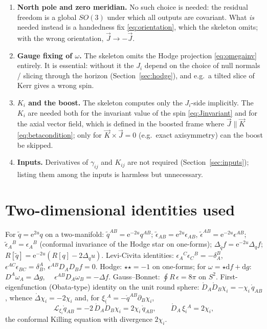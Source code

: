 \documentclass[11pt]{article}
\newcommand{\dd}{\mathrm{d}}
\newcommand{\ee}{\mathrm{e}}
\newcommand{\Lie}{\mathcal{L}}
\newcommand{\qo}{\mathring{q}}          %
\newcommand{\Do}{\mathring{D}}          %
\newcommand{\Lapo}{\mathring{\Delta}}   %
\newcommand{\vJ}{\vec{J}}
\newcommand{\vK}{\vec{K}}
\begin{document}
\begin{enumerate}
  have period $2\pi$).  The physical area form still appears in the final
  integrals \eqref{eq:JKeval}.
\item \textbf{North pole and zero meridian.}  No such choice is needed: the
  residual freedom is a global $SO(3)$ under which all outputs are
  covariant.  What \emph{is} needed instead is a handedness fix
  \eqref{eq:orientation}, which the skeleton omits; with the wrong
  orientation, $\vJ \to -\vJ$.
\item \textbf{Gauge fixing of $\omega$.}  The skeleton omits the Hodge
  projection \eqref{eq:omegainv} entirely.  It is essential: without it the
  $J_i$ depend on the choice of null normals / slicing through the horizon
  (Section~\ref{sec:hodge}), and e.g.\ a tilted slice of Kerr gives a wrong
  spin.
\item \textbf{$K_i$ and the boost.}  The skeleton computes only the
  $J_i$-side implicitly.  The $K_i$ are needed both for the invariant value
  of the spin \eqref{eq:Jinvariant} and for the axial vector field, which is
  defined in the boosted frame where $\vJ\parallel\vK$
  \eqref{eq:betacondition}; only for $\vK\times\vJ = 0$ (e.g.\ exact
  axisymmetry) can the boost be skipped.
\item \textbf{Inputs.}  Derivatives of $\gamma_{ij}$ and $K_{ij}$ are not
  required (Section~\ref{sec:inputs}); listing them among the inputs is
  harmless but unnecessary.
\end{enumerate}

\section{Two-dimensional identities used}
\label{app:identities}

For $\tilde q = \ee^{2u}q$ on a two-manifold:
$\tilde q^{AB} = \ee^{-2u}q^{AB}$;
$\tilde\epsilon_{AB} = \ee^{2u}\epsilon_{AB}$,
$\tilde\epsilon^{AB} = \ee^{-2u}\epsilon^{AB}$;
$\tilde\epsilon_A{}^B = \epsilon_A{}^B$ (conformal invariance of the Hodge
star on one-forms);
$\Delta_{\tilde q}f = \ee^{-2u}\Delta_q f$;
$R[\tilde q] = \ee^{-2u}(R[q] - 2\Delta_q u)$.
Levi-Civita identities: $\epsilon_A{}^C\epsilon_C{}^B = -\delta_A^B$,
$\epsilon^{AC}\epsilon_{BC} = \delta^A_B$,
$\epsilon^{AB}D_AD_Bf = 0$.
Hodge: $\star\star = -1$ on one-forms;
for $\omega = \star\dd f + \dd g$:\ \
$D^A\omega_A = \Delta g$, \ \
$\epsilon^{AB}D_A\omega_B = -\Delta f$.
Gauss--Bonnet: $\oint R\,\epsilon = 8\pi$ on $S^2$.
First-eigenfunction (Obata-type) identity on the unit round sphere:
$\Do_A\Do_B\chi_i = -\chi_i\,\qo_{AB}$, whence $\Lapo\chi_i = -2\chi_i$ and,
for $\xi_i{}^A = -\qo^{AB}\partial_B\chi_i$,
\begin{equation*}
  \Lie_{\xi_i}\qo_{AB} = -2\,\Do_A\Do_B\chi_i = 2\chi_i\,\qo_{AB},
  \qquad
  \Do_A\,\xi_i{}^A = 2\chi_i ,
\end{equation*}
the conformal Killing equation with divergence $2\chi_i$.
\end{document}
